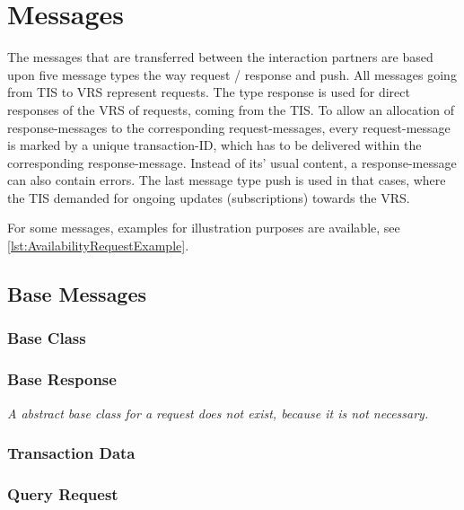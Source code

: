 \chapter{Messages}
\label{cha:Nachrichten}
The messages that are transferred between the interaction partners are based upon five message types the way request / response and push. All messages going from TIS to VRS represent requests. The type response is used for direct responses of the VRS of requests, coming from the TIS. To allow an allocation of response-messages to the corresponding request-messages, every request-message is marked by a unique transaction-ID, which has to be delivered within the corresponding response-message. Instead of its' usual content, a response-message can also contain errors. The last message type push is used in that cases, where the TIS demanded for ongoing updates (subscriptions) towards the VRS.

For some messages, examples for illustration purposes are available, see \cref{lst:AvailabilityRequestExample}.

\section{Base Messages}
\label{sec:Nachrichten:Basisnachrichten}

\subsection*{Base Class}



\subsection*{Base Response}


\medskip

\textit{A abstract base class for a request does not exist, because it is not necessary.}

\subsection*{Transaction Data}



\subsection*{Query Request}



